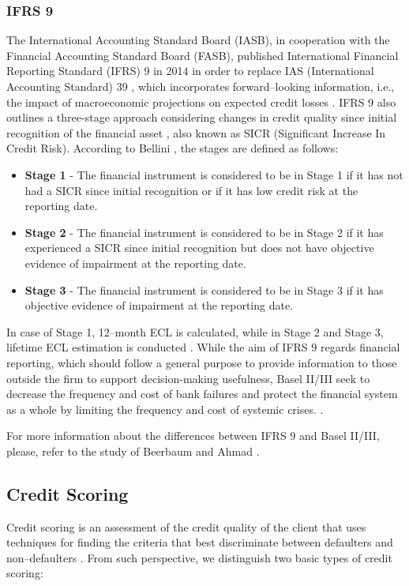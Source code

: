 \subsubsection{IFRS 9}
The International Accounting Standard Board (IASB), in cooperation with the Financial Accounting Standard Board (FASB), published International Financial Reporting Standard (IFRS) 9 in 2014 in order to replace IAS (International Accounting Standard) 39 \citep{temim2016ifrs}, which incorporates forward--looking information, i.e., the impact of macroeconomic projections on expected credit losses \citep{porretta2020credit}.
IFRS 9 also outlines a three-stage approach considering changes in credit quality since initial recognition of the financial asset \citep{beerbaum2015credit}, also known as SICR (Significant Increase In Credit Risk). According to Bellini \citep{bellini2019ifrs}, the stages are defined as follows:
\begin{itemize}\setlength\itemsep{0em}
    \item \textbf{Stage 1} - The financial instrument is considered to be in Stage 1 if it has not had a SICR since initial recognition or if it has low credit risk at the reporting date.
    \item \textbf{Stage 2} - The financial instrument is considered to be in Stage 2 if it has experienced a SICR since initial recognition but does not have objective evidence of impairment at the reporting date.
    \item \textbf{Stage 3} - The financial instrument is considered to be in Stage 3 if it has objective evidence of impairment at the reporting date.
\end{itemize}
In case of Stage 1, 12--month ECL is calculated, while in Stage 2 and Stage 3, lifetime ECL estimation is conducted \citep{gornjak2017ifrs}.
While the aim of IFRS 9 regards financial reporting, which should follow a general purpose to provide information to those outside the firm to support decision-making usefulness, Basel II/III seek to decrease the frequency and cost of bank failures and protect the financial system as a whole by limiting the frequency and cost of systemic crises. \citep{beerbaum2015credit}.


For more information about the differences between IFRS 9 and Basel II/III, please, refer to the study of Beerbaum and Ahmad \citep{beerbaum2015credit}.


\subsection{Credit Scoring}
Credit scoring is an assessment of the credit quality of the client that uses techniques for finding the criteria that best discriminate between defaulters and non--defaulters \citep{bessis2015}. From such perspective, we distinguish two basic types of credit scoring:


